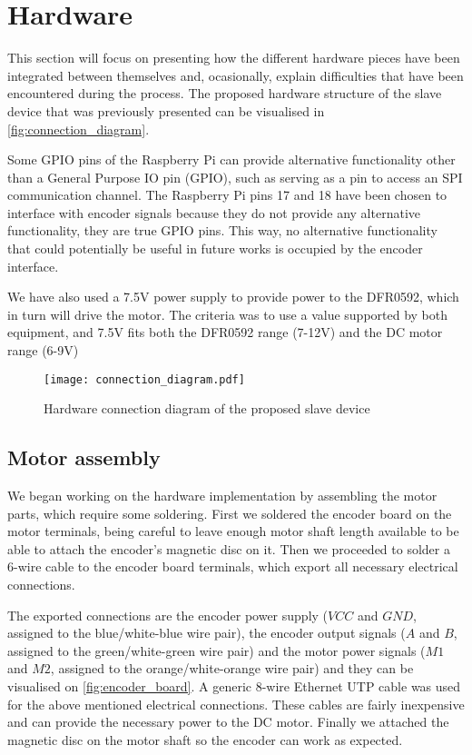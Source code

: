 \section{Hardware} \label{sec:hardware-devel}
This section will focus on presenting how the different hardware pieces have been integrated between themselves and, ocasionally, explain difficulties that have been encountered during the process.
The proposed hardware structure of the slave device that was previously presented can be visualised in \autoref{fig:connection_diagram}.

Some GPIO pins of the Raspberry Pi can provide alternative functionality other than a General Purpose IO pin (GPIO), such as serving as a pin to access an SPI communication channel.
The Raspberry Pi pins 17 and 18 have been chosen to interface with encoder signals because they do not provide any alternative functionality, they are true GPIO pins.
This way, no alternative functionality that could potentially be useful in future works is occupied by the encoder interface.

We have also used a 7.5V power supply to provide power to the DFR0592, which in turn will drive the motor.
The criteria was to use a value supported by both equipment, and 7.5V fits both the DFR0592 range (7-12V) and the DC motor range (6-9V)

\begin{figure}[htp]
	\centering
	\texttt{[image: connection\_diagram.pdf]}
	\caption{Hardware connection diagram of the proposed slave device}
	\label{fig:connection_diagram}
\end{figure}

\subsection{Motor assembly}
We began working on the hardware implementation by assembling the motor parts, which require some soldering.
First we soldered the encoder board on the motor terminals, being careful to leave enough motor shaft length available to be able to attach the encoder's magnetic disc on it.
Then we proceeded to solder a 6-wire cable to the encoder board terminals, which export all necessary electrical connections.

The exported connections are the encoder power supply ($VCC$ and $GND$, assigned to the blue/white-blue wire pair), the encoder output signals ($A$ and $B$, assigned to the green/white-green wire pair) and the motor power signals ($M1$ and $M2$, assigned to the orange/white-orange wire pair) and they can be visualised on \autoref{fig:encoder_board}.
A generic 8-wire Ethernet UTP cable was used for the above mentioned electrical connections.
These cables are fairly inexpensive and can provide the necessary power to the DC motor.
Finally we attached the magnetic disc on the motor shaft so the encoder can work as expected.

